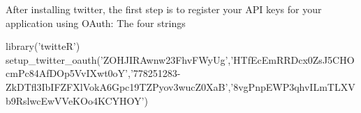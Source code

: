 \documentclass{article}\usepackage[]{graphicx}\usepackage[]{color}
\begin{document}
After installing twitter, the first step is to register your API keys for your application using OAuth: The four strings 


library('twitteR')
setup_twitter_oauth('ZOHJIRAwnw23FhvFWyUg','HTfEcEmRRDcx0ZsJ5CHOcmPc84AfDOp5VvIXwt0oY','778251283-ZkDTfl3IbIFZFXlVokA6Gpc19TZPyov3wucZ0XaB','8vgPnpEWP3qhvILmTLXVb9RslwcEwVVeKOo4KCYHOY')
\end{document}
